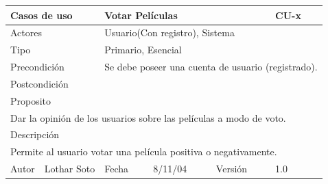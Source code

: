 \documentclass{article}
\begin{document}
\begin{table}[h]
\begin{tabular}{|l|l|l|l|l|l|}
\hline
\multicolumn{2}{|p{2cm}|}{Casos de uso}  & \multicolumn{3}{p{7cm}|}{Votar Películas} & CU-x \\
\hline
\multicolumn{2}{|p{2cm}|}{Actores}       & \multicolumn{4}{p{8cm}|}{Usuario(Con registro), Sistema}        \\
\hline
\multicolumn{2}{|p{2cm}|}{Tipo}          & \multicolumn{4}{p{8cm}|}{Primario, Esencial}        \\
\hline
\multicolumn{2}{|p{2cm}|}{Precondición}  & \multicolumn{4}{p{8cm}|}{Se debe poseer una cuenta de usuario (registrado).}        \\
\hline
\multicolumn{2}{|p{2cm}|}{Postcondición} & \multicolumn{4}{p{8cm}|}{}        \\
\hline
\multicolumn{6}{|p{10cm}|}{Proposito}                                   \\
\hline
\multicolumn{6}{|p{10cm}|}{Dar la opinión de los usuarios sobre las películas a modo de voto.}                                            \\
\hline
\multicolumn{6}{|p{10cm}|}{Descripción}                                 \\
\hline
\multicolumn{6}{|p{10cm}|}{Permite al usuario votar una película positiva o negativamente.}                                            \\
\hline
Autor          &       Lothar Soto        & Fecha    &  8/11/04   &   Versión  & 1.0\\     
\hline
\end{tabular}
\end{table}
\end{document}
